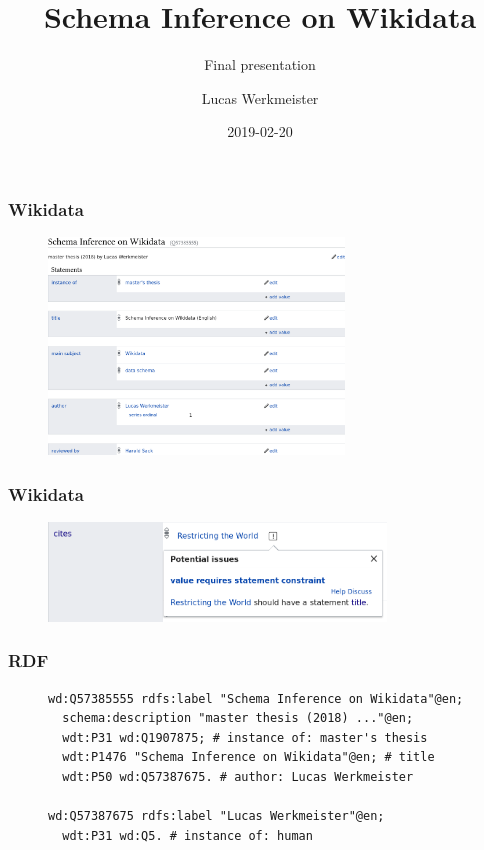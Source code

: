 \documentclass[aspectratio=169]{beamer}
\title{Schema Inference on Wikidata}
\subtitle{Final presentation}
\author{Lucas Werkmeister}
\date{2019-02-20}
\begin{document}
\frame{\titlepage}

\begin{frame}
  \frametitle{Wikidata}
  \begin{figure}
    \includegraphics[width=0.7\textwidth]{item}
  \end{figure}
\end{frame}

\begin{frame}
  \frametitle{Wikidata}
  \begin{figure}
    \includegraphics[width=0.8\textwidth]{constraint}
  \end{figure}
\end{frame}

\begin{frame}[fragile]
  \frametitle{RDF}
  \begin{figure}
    \begin{lstlisting}[language=sparql]
wd:Q57385555 rdfs:label "Schema Inference on Wikidata"@en;
  schema:description "master thesis (2018) ..."@en;
  wdt:P31 wd:Q1907875; # instance of: master's thesis
  wdt:P1476 "Schema Inference on Wikidata"@en; # title
  wdt:P50 wd:Q57387675. # author: Lucas Werkmeister

wd:Q57387675 rdfs:label "Lucas Werkmeister"@en;
  wdt:P31 wd:Q5. # instance of: human
    \end{lstlisting}
  \end{figure}
\end{frame}
\end{document}
